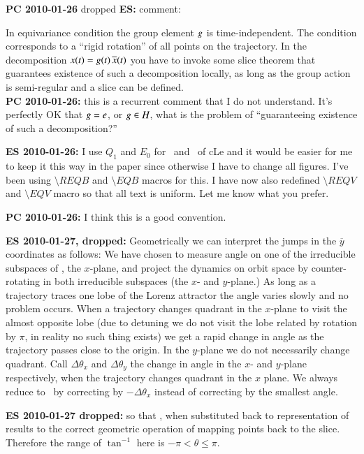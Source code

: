 

{\bf PC 2010-01-26} dropped {\bf ES: } comment:

In equivariance condition  the group
element $g$ is time-independent. The condition
corresponds to a ``rigid rotation'' of all points on the
trajectory. In the decomposition $x(t)=
g(t)\,\overline{x}(t)$ you have to invoke some slice theorem
that guarantees existence of such a decomposition locally, as
long as the group action is semi-regular and a slice can be
defined.
\\
{\bf PC 2010-01-26:} this is a recurrent comment that I do
not understand. It's perfectly  OK that $g= e$, or
$g \in H$, what is the problem of ``guaranteeing
existence of such a decomposition?''

{\bf ES 2010-01-26:}
I use $Q_1$ and $E_0$ for \reqv\ and \eqv\ of cLe and it
would be easier for me to keep it this way in the paper since
otherwise I have to change all figures. I've been using
$\setminus REQB$ and $\setminus EQB$ macros for this. I have
now also redefined $\setminus REQV$ and $\setminus EQV$ macro
so that all text is uniform. Let me know what you prefer.

{\bf PC 2010-01-26:} I think this is a good convention.

{\bf ES 2010-01-27, dropped:}
Geometrically we can interpret the jumps in the
$\overline{y}$ coordinates as follows: We have chosen to
measure angle on one of the irreducible subspaces of ,
the $x$-plane, and project the dynamics on orbit space by
counter-rotating in both irreducible subspaces (the $x$- and
$y$-plane.) As long as a trajectory traces one lobe of the
Lorenz attractor the angle varies slowly and no problem
occurs. When a trajectory changes quadrant in the $x$-plane
to visit the almost opposite lobe (due to detuning we do not
visit the lobe related by rotation by $\pi$, in reality no
such thing exists) we get a rapid change in angle as the
trajectory passes close to the origin. In the $y$-plane we do
not necessarily change quadrant. Call $\Delta \theta_x$ and
$\Delta\theta_y$ the change in angle in the $x$- and
$y$-plane respectively, when the trajectory changes quadrant
in the $x$ plane. We always reduce to \reducedsp\ by
correcting by $-\Delta\theta_x$ instead of correcting by the
smallest angle.

{\bf ES 2010-01-27 dropped:}
so that , when substituted back to
representation  of  results to the
correct geometric operation of mapping points back to the
slice. Therefore the range of $\tan^{-1}$ here is
$-\pi<\theta\leq\pi$.


